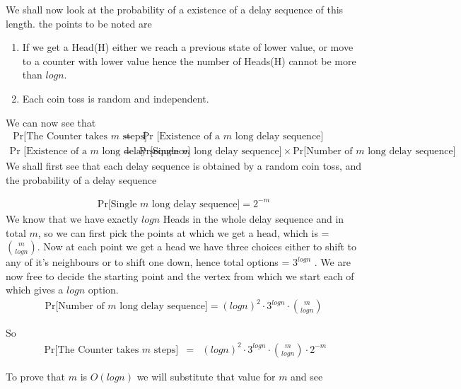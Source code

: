 \documentclass{assignment}
\begin{document}
\begin{problemlist}
\begin{problem}
\begin{answer}
\begin{enumerate}
We shall now look at the probability of a existence of a delay sequence of this length. the points to be noted are \\
\begin{enumerate}
\item If we get a Head(H) either we reach a previous state of lower value, or move to a counter with lower value hence the number of Heads(H) cannot be more than $log n$. 
\item Each coin toss is random and independent.
\end{enumerate}

We can now see that 
\begin{eqnarray}
\text{ Pr[The Counter takes $m$ steps]}& = &\text{ Pr [Existence of a $m$ long delay sequence]} \\
\text{Pr [Existence of a $m$ long delay sequence]} & = & \text{Pr[Single $m$ long delay sequence]} \times \text{Pr[Number of $m$ long delay sequence]} 
\end{eqnarray}
We shall first see that each delay sequence is obtained by a random coin toss, and the probability of a delay sequence 

\begin{eqnarray}
\text{Pr[Single $m$ long delay sequence]} = 2^{-m}
\end{eqnarray}
We know that we have exactly $log n$ Heads in the whole delay sequence and in total $m$, so we can first pick the points at which we get a head, which is  = $\binom{m}{log n}$. Now at each point we get a head we have three choices either to shift to any of it's neighbours or to shift one down, hence total options = $3^{log n}$ . We are now free to decide the starting point and the vertex from which we start each of which gives a $log n$ option. 
\begin{eqnarray}
\text{Pr[Number of  $m$ long delay sequence]} = (log n)^2 \cdot 3^{log n} \cdot \binom {m}{log n}
\end{eqnarray}

So 
\begin{eqnarray}
\text{ Pr[The Counter takes $m$ steps]}& = & (log n)^2 \cdot 3^{log n} \cdot \binom {m}{log n} \cdot 2^{-m}
\end{eqnarray}

To prove that $m$ is $O(log n)$ we will substitute that value for $m$ and see


\end{enumerate}
\end{answer}
\end{problem}
\end{problemlist}
\end{document}
